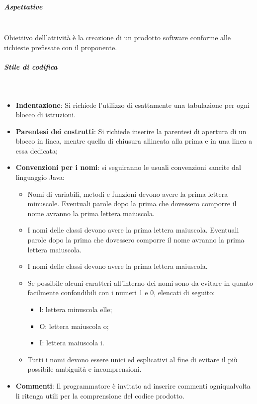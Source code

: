     \subparagraph{Aspettative}
    ~\\
    Obiettivo dell'attività è la creazione di un prodotto software conforme alle richieste prefissate con il proponente.
    
    
     \subparagraph{Stile di codifica}
    ~\\
        \begin{itemize}
            \item \textbf{Indentazione}: Si
            richiede l’utilizzo di esattamente una tabulazione per ogni blocco di istruzioni.
            \item \textbf{Parentesi dei costrutti}: Si richiede inserire la parentesi di apertura di un blocco in linea, mentre quella di chiusura allineata alla prima e in una linea a essa dedicata;
            \item \textbf{Convenzioni per i nomi}: si seguiranno le usuali convenzioni sancite dal linguaggio Java:
                \begin{itemize}
                    \item Nomi di variabili, metodi e funzioni devono avere la prima lettera minuscole. Eventuali parole dopo la prima che dovessero comporre il nome avranno la prima lettera maiuscola.
                    \item I nomi delle classi devono avere la prima lettera maiuscola.  Eventuali parole dopo la prima che dovessero comporre il nome avranno la prima lettera maiuscola.
                    \item I nomi delle classi devono avere la prima lettera maiuscola.
                    \item Se possibile alcuni caratteri all'interno dei nomi sono da evitare in quanto facilmente confondibili con i numeri 1 e 0, elencati di seguito:
                        \begin{itemize}
                            \item l: lettera minuscola elle;
                            \item O: lettera maiuscola o;
                            \item I: lettera maiuscola i.
                        \end{itemize}
                    \item Tutti i nomi devono essere unici ed esplicativi al fine di evitare il più possibile ambiguità e incomprensioni.
                \end{itemize}
            \item \textbf{Commenti}: Il  programmatore  è  invitato  ad  inserire  commenti  ogniqualvolta  li ritenga utili per la comprensione del codice prodotto.

\end{itemize}
